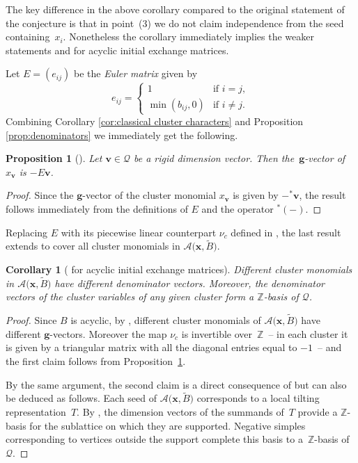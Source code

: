 \documentclass[pdftex]{sigma}
\newcommand{\bfg}{\mathbf{g}}
\newcommand{\bfv}{\mathbf{v}}
\newcommand{\bfx}{\mathbf{x}}
\newcommand{\cA}{\mathcal{A}}
\newcommand{\cQ}{\mathcal{Q}}
\newcommand{\ZZ}{\mathbb{Z}}
\numberwithin{equation}{section}
\newtheorem{Corollary}[Theorem]{Corollary}
\newtheorem{Proposition}[Theorem]{Proposition}
 { \theoremstyle{definition}
\newtheorem{Remark}[Theorem]{Remark} }
\begin{document}
The key difference in the above corollary compared to the original statement of the conjecture is that in point~(3) we do not claim independence from the seed containing~$x_i$. Nonetheless the corollary immediately implies the weaker statements \cite[Conjecture~7.5]{fomin-zelevinsky4} and \cite[Conjecture~2.9]{reading-stella} for acyclic initial exchange matrices.

Let $E=(e_{ij})$ be the \emph{Euler matrix} given by
 \[
 e_{ij} =
 \begin{cases}
 1 & \text{if $i=j$},\\
 \min(b_{ij},0) & \text{if $i\ne j$}.
 \end{cases}
 \]
 Combining Corollary \ref{cor:classical cluster characters} and Proposition \ref{prop:denominators} we immediately get the following.
 \begin{Proposition}[{\cite[Conjecture 3.21]{reading-speyer}}] \label{prop:d to g} Let $\bfv\in\cQ$ be a rigid dimension vector. Then the~$\bfg$-vector of $x_\bfv$ is $-E\bfv$.
 \end{Proposition}
 \begin{proof} Since the $\bfg$-vector of the cluster monomial $x_\bfv$ is given by $-{}^*\bfv$, the result follows immediately from the definitions of $E$ and the operator ${}^*(-)$.
\end{proof}

Replacing $E$ with its piecewise linear counterpart $\nu_c$ defined in \cite{reading-stella-2}, the last result extends to cover all cluster monomials in $\cA\big(\bfx,\widetilde{B}\big)$.

 \begin{Corollary}[{\cite[Conjecture 7.6]{fomin-zelevinsky4}} for acyclic initial exchange matrices] \label{cor:d_vect basis} Different cluster monomials in $\cA\big(\bfx,\widetilde{B}\big)$ have different denominator vectors. Moreover, the denominator vectors of the cluster variables of any given cluster form a $\ZZ$-basis of $\cQ$.
 \end{Corollary}
\begin{proof} Since $B$ is acyclic, by \cite[Remark~7.2 and Proposition~11.6]{demonet2}, different cluster monomials of $\cA\big(\bfx,\widetilde{B}\big)$ have different $\bfg$-vectors.
 Moreover the map $\nu_c$ is invertible over~$\ZZ$~-- in each cluster it is given by a triangular matrix with all the diagonal entries equal to $-1$~-- and the first claim follows from Proposition~\ref{prop:d to g}.

By the same argument, the second claim is a direct consequence of \cite[Proposition~11.5]{demonet2} but can also be deduced as follows. Each seed of $\cA\big(\bfx,\widetilde{B}\big)$ corresponds to a local tilting representation~$T$. By \cite[Lemma~4.3 and Theorem~4.5]{happel-ringel}, the dimension vectors of the summands of~$T$ provide a $\ZZ$-basis for the sublattice on which they are supported. Negative simples corresponding to vertices outside the support complete this basis to a~$\ZZ$-basis of~$\cQ$.
 \end{proof}
\end{document}
